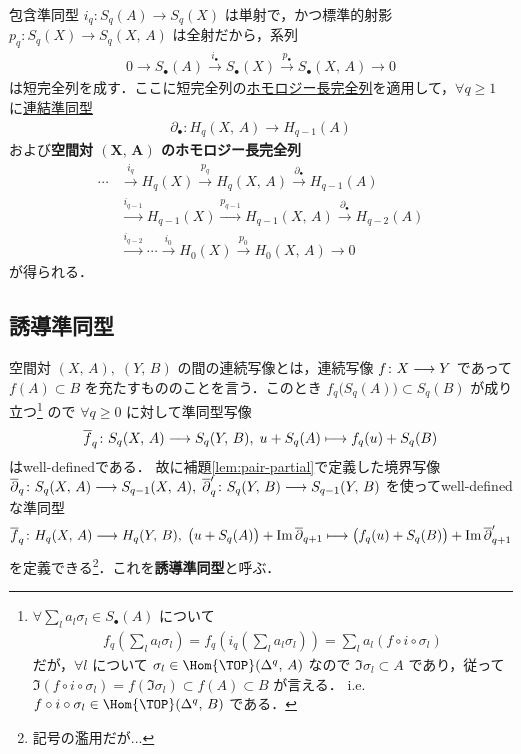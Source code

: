 \documentclass[algtopo_main]{subfiles}
\begin{document}
包含準同型 $i_q \colon S_q(A) \longrightarrow S_q(X)$ は単射で，かつ標準的射影 $p_q \colon S_q(X) \longrightarrow S_q(X,\, A)$ は全射だから，系列
\begin{align}
    0 \to S_\bullet(A) \xrightarrow{i_\bullet} S_\bullet(X) \xrightarrow{p_\bullet} S_\bullet (X,\, A) \to 0        
\end{align}
は短完全列を成す．ここに短完全列の\hyperref[lem:preLES-homology]{ホモロジー長完全列}を適用して，$\forall q \ge 1$ に\hyperref[lem:preconne]{連結準同型}
\begin{align}
    \partial_\bullet \colon H_q(X,\, A) \longrightarrow H_{q-1}(A)
\end{align}
および\textbf{空間対 $\bm{(X,\, A)}$ のホモロジー長完全列}
\begin{align}
    \cdots &\xrightarrow{i_q} H_q(X) \xrightarrow{p_q} H_q(X,\, A) \xrightarrow{\partial_\bullet} H_{q-1}(A) \\
    &\xrightarrow{i_{q-1}} H_{q-1}(X) \xrightarrow{p_{q-1}} H_{q-1}(X,\, A) \xrightarrow{\partial_\bullet} H_{q-2}(A) \\
    &\xrightarrow{i_{q-2}} \cdots \xrightarrow{i_0} H_0(X) \xrightarrow{p_0} H_0(X,\, A) \to 0
\end{align}
が得られる．

\subsection{誘導準同型}

空間対 $(X,\, A),\; (Y,\, B)$ の間の連続写像とは，連続写像 $f \colon X \longrightarrow Y$ であって $f(A) \subset B$ を充たすもののことを言う．このとき 
$f_q \bigl( S_q(A) \bigr)  \subset S_q(B)$ が成り立つ\footnote{
    $\forall \sum_l a_l \sigma_l \in S_\bullet (A)$ について
    \begin{align}
        f_q \left( \sum_l a_l \sigma_l \right) = f_q \left( i_q \left( \sum_l a_l \sigma_l \right)  \right) = \sum_l a_l (f \circ i \circ \sigma_l)
    \end{align}
    だが，$\forall l$ について $\sigma_l \in \Hom{\TOP}(\Delta^q,\, A)$ なので $\Im \sigma_l \subset A$ であり，従って $\Im (f \circ i \circ \sigma_l) = f ( \Im \sigma_l ) \subset f(A) \subset B$ が言える．
    i.e.
    $f \circ i \circ \sigma_l \in \Hom{\TOP} (\Delta^q,\, B)$ である．
}
ので
$\forall q \ge 0$ に対して準同型写像
\begin{align}
    \overline{f}_q \colon S_q(X,\, A) \longrightarrow S_q(Y,\, B),\; u + S_q(A) \longmapsto f_q(u) + S_q (B)
\end{align}
はwell-definedである．
故に補題\ref{lem:pair-partial}で定義した境界写像 $\overline{\partial}_q \colon S_q(X,\, A) \longrightarrow S_{q-1} (X,\, A),\; \overline{\partial}'_q \colon S_q(Y,\, B) \longrightarrow S_{q-1} (Y,\, B)$ を使ってwell-definedな準同型
\begin{align}
    \label{eq:induced-rel}
    \overline{f}_q \colon H_q(X,\, A) \longrightarrow H_q(Y,\, B),\; \bigl(u + S_q(A) \bigr) + \Im \overline{\partial}_{q+1} \longmapsto \bigl( f_q(u) + S_q (B) \bigr) + \Im \overline{\partial}'_{q+1}
\end{align}
を定義できる\footnote{記号の濫用だが...}．これを\textbf{誘導準同型}と呼ぶ．
\end{document}

